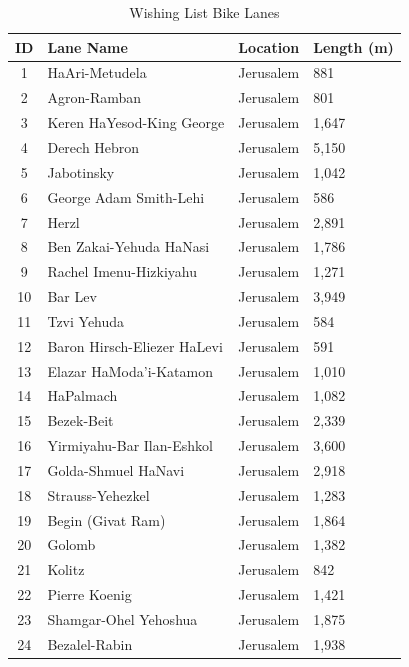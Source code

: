 \begin{table}[H]
\centering
\caption{Wishing List Bike Lanes}
\label{tab:wishing_list}
\small
\begin{tabular}{@{}clll@{}}
\toprule
\textbf{ID} & \textbf{Lane Name} & \textbf{Location} & \textbf{Length (m)} \\
\midrule
1 & HaAri-Metudela & Jerusalem & 881 \\
2 & Agron-Ramban & Jerusalem & 801 \\
3 & Keren HaYesod-King George & Jerusalem & 1,647 \\
4 & Derech Hebron & Jerusalem & 5,150 \\
5 & Jabotinsky & Jerusalem & 1,042 \\
6 & George Adam Smith-Lehi & Jerusalem & 586 \\
7 & Herzl & Jerusalem & 2,891 \\
8 & Ben Zakai-Yehuda HaNasi & Jerusalem & 1,786 \\
9 & Rachel Imenu-Hizkiyahu & Jerusalem & 1,271 \\
10 & Bar Lev & Jerusalem & 3,949 \\
11 & Tzvi Yehuda & Jerusalem & 584 \\
12 & Baron Hirsch-Eliezer HaLevi & Jerusalem & 591 \\
13 & Elazar HaModa'i-Katamon & Jerusalem & 1,010 \\
14 & HaPalmach & Jerusalem & 1,082 \\
15 & Bezek-Beit & Jerusalem & 2,339 \\
16 & Yirmiyahu-Bar Ilan-Eshkol & Jerusalem & 3,600 \\
17 & Golda-Shmuel HaNavi & Jerusalem & 2,918 \\
18 & Strauss-Yehezkel & Jerusalem & 1,283 \\
19 & Begin (Givat Ram) & Jerusalem & 1,864 \\
20 & Golomb & Jerusalem & 1,382 \\
21 & Kolitz & Jerusalem & 842 \\
22 & Pierre Koenig & Jerusalem & 1,421 \\
23 & Shamgar-Ohel Yehoshua & Jerusalem & 1,875 \\
24 & Bezalel-Rabin & Jerusalem & 1,938 \\
\bottomrule
\end{tabular}
\end{table}
